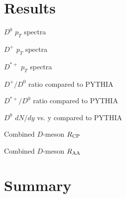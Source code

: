 \documentclass[%
 reprint,
 amsmath,amssymb,
 aps,
]{revtex4-1}
\begin{document}
\section{Results}
\label{sec:result}

$D^0$ $p_T$ spectra

$D^+$ $p_T$ spectra

$D^{*+}$ $p_T$ spectra

$D^+/D^0$ ratio compared to PYTHIA

$D^{*+}/D^0$ ratio compared to PYTHIA

$D^0$ $dN/dy$ vs. y compared to PYTHIA

Combined $D$-meson $R_{\rm CP}$

Combined $D$-meson $R_{\rm AA}$

\section{Summary}
\label{sec:summary}


\end{document}
